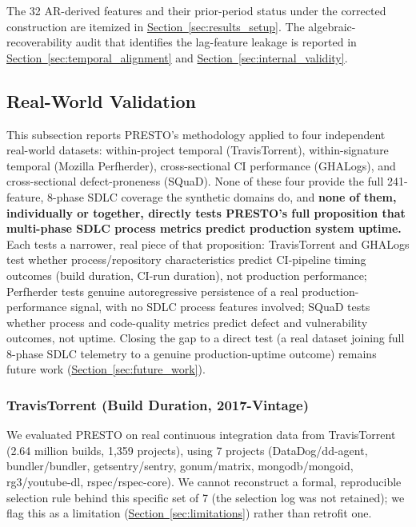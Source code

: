 \documentclass[technologies,article,submit,pdftex,moreauthors]{Definitions/mdpi}
\begin{document}
The 32 AR-derived features and their prior-period status under the corrected construction are itemized in \hyperref[sec:results_setup]{Section~\ref*{sec:results_setup}}. The algebraic-recoverability audit that identifies the lag-feature leakage is reported in \hyperref[sec:temporal_alignment]{Section~\ref*{sec:temporal_alignment}} and \hyperref[sec:internal_validity]{Section~\ref*{sec:internal_validity}}.

\subsection{Real-World Validation}\label{sec:real_world_results}

This subsection reports PRESTO's methodology applied to four independent real-world datasets: within-project temporal (TravisTorrent), within-signature temporal (Mozilla Perfherder), cross-sectional CI performance (GHALogs), and cross-sectional defect-proneness (SQuaD). None of these four provide the full 241-feature, 8-phase SDLC coverage the synthetic domains do, and \textbf{none of them, individually or together, directly tests PRESTO's full proposition that multi-phase SDLC process metrics predict production system uptime.} Each tests a narrower, real piece of that proposition: TravisTorrent and GHALogs test whether process/repository characteristics predict CI-pipeline timing outcomes (build duration, CI-run duration), not production performance; Perfherder tests genuine autoregressive persistence of a real production-performance signal, with no SDLC process features involved; SQuaD tests whether process and code-quality metrics predict defect and vulnerability outcomes, not uptime. Closing the gap to a direct test (a real dataset joining full 8-phase SDLC telemetry to a genuine production-uptime outcome) remains future work (\hyperref[sec:future_work]{Section~\ref*{sec:future_work}}).

\subsubsection{TravisTorrent (Build Duration, 2017-Vintage)}\label{sec:travistorrent}

We evaluated PRESTO on real continuous integration data from TravisTorrent \citep{beller2017travistorrent} (2.64 million builds, 1,359 projects), using 7 projects (DataDog/dd-agent, bundler/bundler, getsentry/sentry, gonum/matrix, mongodb/mongoid, rg3/youtube-dl, rspec/rspec-core). We cannot reconstruct a formal, reproducible selection rule behind this specific set of 7 (the selection log was not retained); we flag this as a limitation (\hyperref[sec:limitations]{Section~\ref*{sec:limitations}}) rather than retrofit one.
\end{document}
